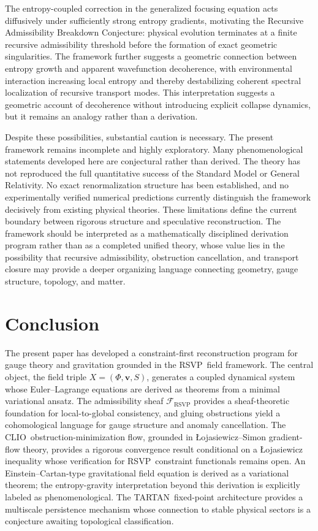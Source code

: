 \documentclass[12pt,a4paper]{article}
\newcommand{\RSVP}{\textrm{RSVP}}
\newcommand{\CLIO}{\textrm{CLIO}}
\newcommand{\TARTAN}{\textrm{TARTAN}}
\newcommand{\Sheaf}{\mathcal{F}}
\begin{document}
The entropy-coupled correction in the generalized focusing equation acts
diffusively under sufficiently strong entropy gradients, motivating the
Recursive Admissibility Breakdown Conjecture: physical evolution terminates at
a finite recursive admissibility threshold before the formation of exact
geometric singularities. The framework further suggests a geometric connection
between entropy growth and apparent wavefunction decoherence, with environmental
interaction increasing local entropy and thereby destabilizing coherent spectral
localization of recursive transport modes. This interpretation suggests a
geometric account of decoherence without introducing explicit collapse dynamics,
but it remains an analogy rather than a derivation.

Despite these possibilities, substantial caution is necessary. The present
framework remains incomplete and highly exploratory. Many phenomenological
statements developed here are conjectural rather than derived. The theory has
not reproduced the full quantitative success of the Standard Model or General
Relativity. No exact renormalization structure has been established, and no
experimentally verified numerical predictions currently distinguish the framework
decisively from existing physical theories. These limitations define the current
boundary between rigorous structure and speculative reconstruction. The framework
should be interpreted as a mathematically disciplined derivation program rather
than as a completed unified theory, whose value lies in the possibility that
recursive admissibility, obstruction cancellation, and transport closure may
provide a deeper organizing language connecting geometry, gauge structure,
topology, and matter.

\section{Conclusion}

The present paper has developed a constraint-first reconstruction program for
gauge theory and gravitation grounded in the \RSVP\ field framework. The central
object, the field triple $X=(\Phi,\mathbf{v},S)$, generates a coupled dynamical
system whose Euler--Lagrange equations are derived as theorems from a minimal
variational ansatz. The admissibility sheaf $\Sheaf_\RSVP$ provides a
sheaf-theoretic foundation for local-to-global consistency, and gluing
obstructions yield a cohomological language for gauge structure and anomaly
cancellation. The \CLIO\ obstruction-minimization flow, grounded in
Łojasiewicz--Simon gradient-flow theory, provides a rigorous convergence result
conditional on a Łojasiewicz inequality whose verification for \RSVP\ constraint
functionals remains open. An Einstein--Cartan-type gravitational field equation
is derived as a variational theorem; the entropy-gravity interpretation beyond
this derivation is explicitly labeled as phenomenological. The \TARTAN\
fixed-point architecture provides a multiscale persistence mechanism whose
connection to stable physical sectors is a conjecture awaiting topological
classification.
\end{document}
